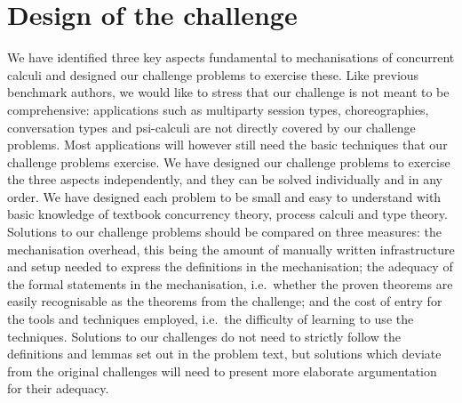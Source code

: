 \documentclass[runningheads]{llncs}
\begin{document}
\section{Design of the challenge}
We have identified three key aspects fundamental to mechanisations of concurrent calculi and designed our challenge problems to exercise these.
Like previous benchmark authors, we would like to stress that our challenge is not meant to be comprehensive: applications such as multiparty session types, choreographies, conversation types and psi-calculi are not directly covered by our challenge problems.
Most applications will however still need the basic techniques that our challenge problems exercise.
We have designed our challenge problems to exercise the three aspects independently, and they can be solved individually and in any order.
We have designed each problem to be small and easy to understand with basic knowledge of textbook concurrency theory, process calculi and type theory.
Solutions to our challenge problems should be compared on three measures: the mechanisation overhead, this being the amount of manually written infrastructure and setup needed to express the definitions in the mechanisation; the adequacy of the formal statements in the mechanisation, i.e.\ whether the proven theorems are easily recognisable as the theorems from the challenge; and the cost of entry for the tools and techniques employed, i.e.\ the difficulty of learning to use the techniques.
Solutions to our challenges do not need to strictly follow the definitions and lemmas set out in the problem text, but solutions which deviate from the original challenges will need to present more elaborate argumentation for their adequacy.
\end{document}
